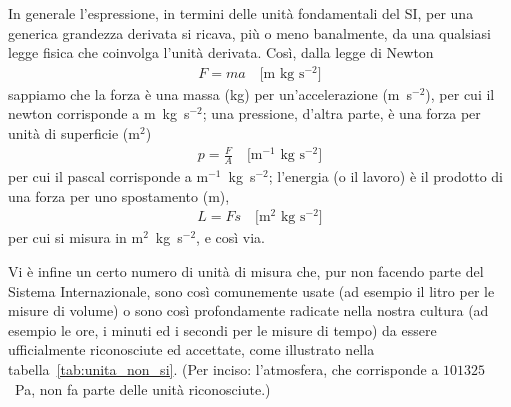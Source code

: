 In generale l'espressione, in termini delle unità fondamentali del SI, per una
generica grandezza derivata si ricava, più o meno banalmente, da una
qualsiasi legge fisica che coinvolga l'unità derivata. Così, dalla legge di
Newton
\begin{align*}
  F = ma \quad \text{[m~kg~s$^{-2}$]}
\end{align*}
sappiamo che la forza è una massa (kg) per un'accelerazione (m~s$^{-2}$),
per cui il newton corrisponde a m~kg~s$^{-2}$; una pressione, d'altra parte,
è una forza per unità di superficie (m$^2$)
\begin{align*}
  p = \frac{F}{A} \quad \text{[m$^{-1}$~kg~s$^{-2}$]}
\end{align*}
per cui il pascal corrisponde a m$^{-1}$~kg~s$^{-2}$; l'energia (o il lavoro) è
il prodotto di una forza per uno spostamento (m),
\begin{align*}
L = F s \quad \text{[m$^2$~kg~s$^{-2}$]}
\end{align*}
per cui si misura in m$^2$~kg~s$^{-2}$, e così via.

Vi è infine un certo numero di unità di misura che, pur non facendo parte
del Sistema Internazionale, sono così comunemente usate (ad esempio il
litro per le misure di volume) o sono così profondamente radicate nella
nostra cultura (ad esempio le ore, i minuti ed i secondi per le misure di tempo)
da essere ufficialmente riconosciute ed accettate, come illustrato nella
tabella~\ref{tab:unita_non_si}.
(Per inciso: l'atmosfera, che corrisponde a $101325$~Pa, non fa parte delle
unità riconosciute.)

\begin{table}[!htb]
\end{table}



